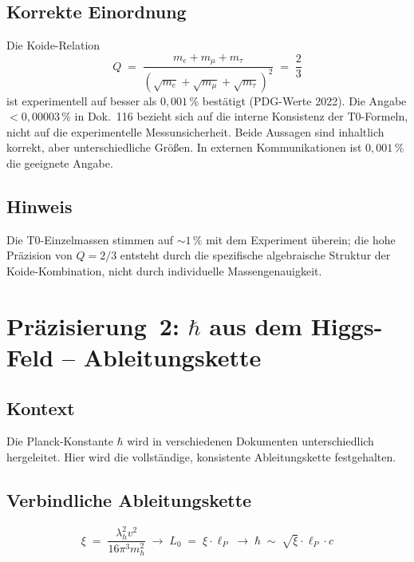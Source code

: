\subsection*{Korrekte Einordnung}

Die Koide-Relation
\begin{equation}
  Q \;=\; \frac{m_e + m_\mu + m_\tau}
               {(\sqrt{m_e}+\sqrt{m_\mu}+\sqrt{m_\tau})^2}
  \;=\; \frac{2}{3}
  \tag{190.7}
\end{equation}
ist experimentell auf besser als $0{,}001\,\%$ bestätigt
(PDG-Werte 2022). Die Angabe $< 0{,}00003\,\%$ in Dok.~116 bezieht
sich auf die interne Konsistenz der T0-Formeln, nicht auf die
experimentelle Messunsicherheit. Beide Aussagen sind inhaltlich korrekt,
aber unterschiedliche Größen. In externen Kommunikationen ist
$0{,}001\,\%$ die geeignete Angabe.

\subsection*{Hinweis}

Die T0-Einzelmassen stimmen auf $\sim 1\,\%$ mit dem Experiment überein;
die hohe Präzision von $Q = 2/3$ entsteht durch die spezifische
algebraische Struktur der Koide-Kombination, nicht durch individuelle
Massengenauigkeit.

\section{\texorpdfstring{Präzisierung~2: $\hbar$ aus dem Higgs-Feld -- Ableitungskette}{Praezisierung 2: hbar aus dem Higgs-Feld -- Ableitungskette}}

\subsection*{Kontext}

Die Planck-Konstante $\hbar$ wird in verschiedenen Dokumenten
unterschiedlich hergeleitet. Hier wird die vollständige, konsistente
Ableitungskette festgehalten.

\subsection*{Verbindliche Ableitungskette}

\begin{equation}
  \xi \;=\; \frac{\lambda_h^2 v^2}{16\pi^3 m_h^2}
  \;\longrightarrow\;
  L_0 \;=\; \xi \cdot \ell_P
  \;\longrightarrow\;
  \hbar \;\sim\; \sqrt{\xi}\cdot \ell_P \cdot c
  \tag{190.8}
\end{equation}

